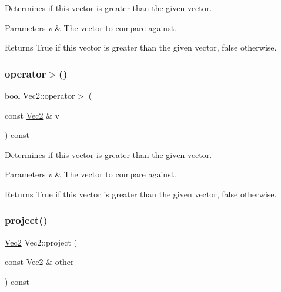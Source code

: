 Determines if this vector is greater than the given vector.


\begin{DoxyParams}{Parameters}
{\em v} & The vector to compare against.\\
\hline
\end{DoxyParams}
\begin{DoxyReturn}{Returns}
True if this vector is greater than the given vector, false otherwise. 
\end{DoxyReturn}
\mbox{\label{classVec2_a40d9c6d4290844d86f27cb76fb8a3556}} 
\subsubsection{\texorpdfstring{operator$>$()}{operator>()}\hspace{0.1cm}{\footnotesize\ttfamily [2/2]}}
{\footnotesize\ttfamily bool Vec2\+::operator$>$ (\begin{DoxyParamCaption}\item[{const \hyperlink{classVec2}{Vec2} \&}]{v }\end{DoxyParamCaption}) const\hspace{0.3cm}{\ttfamily [inline]}}

Determines if this vector is greater than the given vector.


\begin{DoxyParams}{Parameters}
{\em v} & The vector to compare against.\\
\hline
\end{DoxyParams}
\begin{DoxyReturn}{Returns}
True if this vector is greater than the given vector, false otherwise. 
\end{DoxyReturn}
\mbox{\label{classVec2_ad1fc26536c25f01208a26e769c980b8d}} 
\subsubsection{\texorpdfstring{project()}{project()}\hspace{0.1cm}{\footnotesize\ttfamily [1/2]}}
{\footnotesize\ttfamily \hyperlink{classVec2}{Vec2} Vec2\+::project (\begin{DoxyParamCaption}\item[{const \hyperlink{classVec2}{Vec2} \&}]{other }\end{DoxyParamCaption}) const\hspace{0.3cm}{\ttfamily [inline]}}

